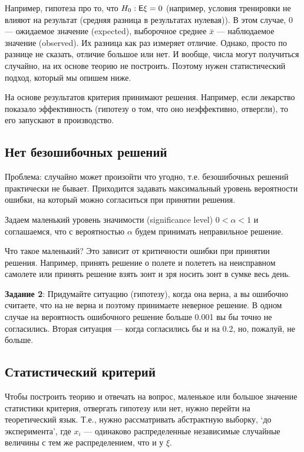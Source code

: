 Например, гипотеза про то, что $H_{0}:\mathsf{E}\xi=0$ (например, условия тренировки не влияют на результат (средняя разница в результатах нулевая)).
В этом случае, 0 --- ожидаемое значение (expected), выборочное среднее $\bar{x}$ --- наблюдаемое значение (observed). Их разница как раз измеряет отличие. Однако, просто по разнице не сказать, отличие большое или нет.
И вообще, числа могут получиться случайно, на их основе теорию не построить. Поэтому нужен статистический подход, который мы опишем ниже.

На основе результатов критерия принимают решения. Например, если лекарство показало эффективность (гипотезу о том, что оно неэффективно, отвергли), то его запускают в производство.

\subsection{Нет безошибочных решений}

Проблема: случайно может произойти что угодно, т.е. безошибочных решений практически не бывает. Приходится задавать максимальный уровень вероятности ошибки, на который можно согласиться при принятии решения.

Задаем маленький уровень значимости (significance level) $0<\alpha<1$ и соглашаемся, что с вероятностью $\alpha$ будем принимать неправильное решение.

Что такое маленький? Это зависит от критичности ошибки при принятии решения. Например, принять решение о полете и полететь на неисправном самолете или принять решение взять зонт и зря носить зонт в сумке весь день.

\textbf{Задание 2}: Придумайте ситуацию (гипотезу), когда она верна, а вы ошибочно считаете, что на не верна и поэтому принимаете неверное решение. В одном случае на вероятность ошибочного решение больше 0.001 вы бы точно не согласились.
Вторая ситуация --- когда согласились бы и на 0.2, но, пожалуй, не больше.

\subsection{Статистический критерий}
Чтобы построить теорию и отвечать на вопрос, маленькое или большое значение статистики критерия, отвергать гипотезу или нет, нужно перейти на теоретический язык.
Т.е., нужно рассматривать абстрактную выборку, `до эксперимента', где $x_i$ --- одинаково распределенные независимые случайные величины с тем же распределением, что и у $\xi$.

